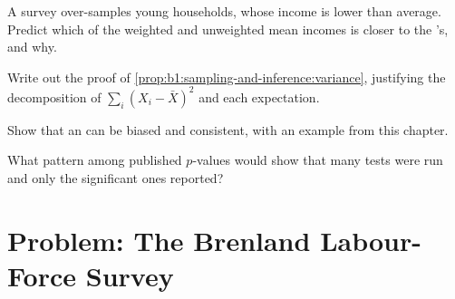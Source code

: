 \begin{exercise}[$\star\star$]\label{exo:b1:sampling-and-inference:predict}
A survey over-samples young households, whose income is lower than
average. Predict which of the weighted and unweighted mean incomes is closer
to the 's, and why.
\end{exercise}

\begin{exercise}[$\star\star\star$]\label{exo:b1:sampling-and-inference:unbiased}
Write out the proof of \cref{prop:b1:sampling-and-inference:variance}, justifying the
decomposition of $\sum_i (X_i - \bar X)^2$ and each expectation.
\end{exercise}

\begin{exercise}[$\star\star\star$]\label{exo:b1:sampling-and-inference:consistent}
Show that an  can be biased and consistent, with an example from
this chapter.
\end{exercise}

\begin{exercise}[$\star\star\star$]\label{exo:b1:sampling-and-inference:search}
What pattern among published $p$-values would show that many tests were run
and only the significant ones reported?
\end{exercise}

\section{Problem: The Brenland Labour-Force Survey}\label{sec:b1:sampling-and-inference:problem}

